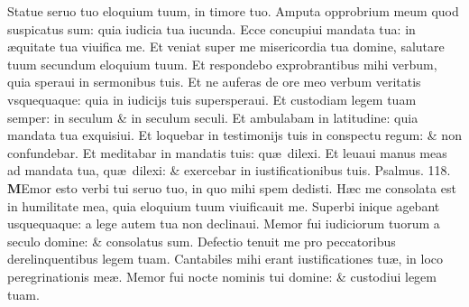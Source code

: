 \documentclass[a5paper,10pt]{book}
\def\ae{æ}
\begin{document}
\begin{multicols*}{2}
\newline \color{red} S\color{black}tatue seruo tuo eloquium tuum, in timore tuo.
\newline \color{red} A\color{black}mputa opprobrium meum quod suspicatus sum: quia iudicia tua iucunda.
\newline \color{red} E\color{black}cce concupiui mandata tua: in \ae quitate tua viuifica me.
\newline \color{red} E\color{black}t veniat super me misericordia tua domine, salutare tuum secundum eloquium tuum.
\newline \color{red} E\color{black}t respondebo exprobrantibus mihi verbum, quia speraui in sermonibus tuis.
\newline \color{red} E\color{black}t ne auferas de ore meo verbum veritatis vsquequaque: quia in iudicijs tuis supersperaui.
\newline \color{red} E\color{black}t custodiam legem tuam semper: in seculum \& in seculum seculi.
\newline \color{red} E\color{black}t ambulabam in latitudine: quia mandata tua exquisiui.
\newline \color{red} E\color{black}t loquebar in testimonijs tuis in conspectu regum: \& non confundebar.
\newline \color{red} E\color{black}t meditabar in mandatis tuis: qu\ae \ dilexi.
\newline \color{red} E\color{black}t leuaui manus meas ad mandata tua, qu\ae \ dilexi: \& exercebar in iustificationibus tuis. \quad \color{red} Psalmus. 118. \color{black}
\vspace{-1em}
\lettrine[lines=2]{\bfseries \color{red} M}{}Emor esto verbi tui seruo tuo, in quo mihi spem dedisti.
\newline \color{red} H\color{black}\ae c me consolata est in humilitate mea, quia eloquium tuum viuificauit me.
\newline \color{red} S\color{black}uperbi inique agebant usquequaque: a lege autem tua non declinaui.
\newline \color{red} M\color{black}emor fui iudiciorum tuorum a seculo domine: \& consolatus sum.
\newline \color{red} D\color{black}efectio tenuit me pro peccatoribus derelinquentibus legem tuam.
\newline \color{red} C\color{black}antabiles mihi erant iustificationes tu\ae , in loco peregrinationis me\ae .
\newline \color{red} M\color{black}emor fui nocte nominis tui domine: \& custodiui legem tuam.

\end{multicols*}
\end{document}
